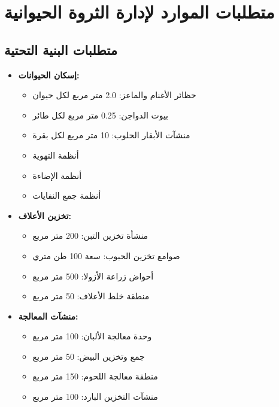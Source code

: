 \section{متطلبات الموارد لإدارة الثروة الحيوانية}

\subsection{متطلبات البنية التحتية}
\begin{itemize}
    \item \textbf{إسكان الحيوانات:}
    \begin{itemize}
        \item حظائر الأغنام والماعز: 2.0 متر مربع لكل حيوان
        \item بيوت الدواجن: 0.25 متر مربع لكل طائر
        \item منشآت الأبقار الحلوب: 10 متر مربع لكل بقرة
        \item أنظمة التهوية
        \item أنظمة الإضاءة
        \item أنظمة جمع النفايات
    \end{itemize}
    
    \item \textbf{تخزين الأعلاف:}
    \begin{itemize}
        \item منشأة تخزين التبن: 200 متر مربع
        \item صوامع تخزين الحبوب: سعة 100 طن متري
        \item أحواض زراعة الأزولا: 500 متر مربع
        \item منطقة خلط الأعلاف: 50 متر مربع
    \end{itemize}
    
    \item \textbf{منشآت المعالجة:}
    \begin{itemize}
        \item وحدة معالجة الألبان: 100 متر مربع
        \item جمع وتخزين البيض: 50 متر مربع
        \item منطقة معالجة اللحوم: 150 متر مربع
        \item منشآت التخزين البارد: 100 متر مربع
    \end{itemize}
\end{itemize}

